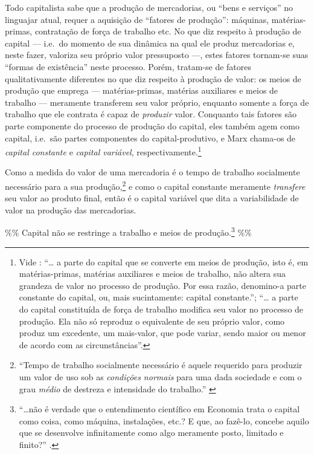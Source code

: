 \documentclass[12pt]{article}
\numberwithin{equation}{section}
\theoremstyle{plain}
\theoremstyle{definition}
\theoremstyle{remark}
\begin{document}
Todo capitalista sabe que a produção de mercadorias, ou ``bens e serviços'' no linguajar atual, requer a aquisição de ``fatores de produção'': máquinas, matérias-primas, contratação de força de trabalho etc. No que diz respeito à produção de capital --- i.e.~do momento de sua dinâmica na qual ele produz mercadorias e, neste fazer, valoriza seu próprio valor pressuposto ---, estes fatores tornam-se suas ``formas de existência'' neste processo. Porém, tratam-se de fatores qualitativamente diferentes no que diz respeito à produção de valor: os meios de produção que emprega --- matérias-primas, matérias auxiliares e meios de trabalho --- meramente transferem seu valor próprio, enquanto somente a força de trabalho que ele contrata é capaz de \emph{produzir} valor. Conquanto tais fatores são parte componente do processo de produção do capital, eles também agem como capital, i.e.~são partes componentes do capital-produtivo, e Marx chama-os de \emph{capital constante} e \emph{capital variável}, respectivamente.\footnote{Vide \parencite[p. 286]{Marx2017}: ``\ldots{} a parte do capital que se converte em meios de produção, isto é, em matérias-primas, matérias auxiliares e meios de trabalho, não altera sua grandeza de valor no processo de produção. Por essa razão, denomino-a parte constante do capital, ou, mais sucintamente: capital constante.''; ``\ldots{} a parte do capital constituída de força de trabalho modifica seu valor no processo de produção. Ela não só reproduz o equivalente de seu próprio valor, como produz um excedente, um mais-valor, que pode variar, sendo maior ou menor de acordo com as circunstâncias''.}

Como a medida do valor de uma mercadoria é o tempo de trabalho socialmente necessário para a sua produção,\footnote{``Tempo de trabalho socialmente necessário é aquele requerido para produzir um valor de uso sob as \emph{condições normais} para uma dada sociedade e com o grau \emph{médio} de destreza e intensidade do trabalho.'' \parencite[p. 117, grifo meu]{Marx2017}} e como o capital constante meramente \emph{transfere} seu valor ao produto final, então é o capital variável que dita a variabilidade de valor na produção das mercadorias.

\%\% Capital não se restringe a trabalho e meios de produção.\footnote{``\ldots não é verdade que o entendimento científico em Economia trata o capital como coisa, como máquina, instalações, etc.? E que, ao fazê-lo, concebe aquilo que se desenvolve infinitamente como algo meramente posto, limitado e finito?'' \parencite[p. 10]{Prado2009a}.} \%\%
\end{document}
